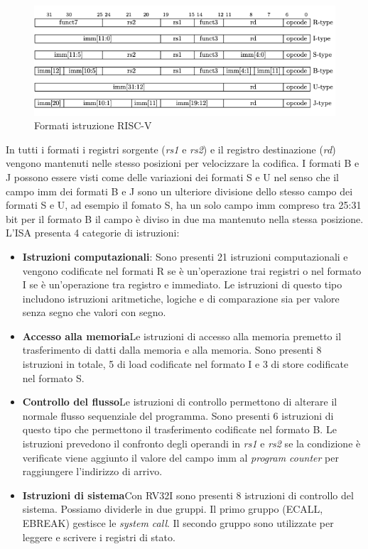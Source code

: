 \documentclass[12pt,a4paper]{report}
\begin{document}
\begin{figure}[h!]
	\includegraphics[width = \textwidth]{FormatiIstruzione.png}
	\caption{Formati istruzione RISC-V}
	\label{Fig:Formati_istruzioni_RV32I}
\end{figure}


In tutti i formati i registri sorgente (\textit{rs1} e \textit{rs2}) e il registro destinazione (\textit{rd}) vengono mantenuti nelle stesso posizioni per velocizzare la codifica.
I formati B e J possono essere visti come delle variazioni dei formati S e U nel senso che il campo imm dei formati B e J sono un ulteriore divisione dello stesso campo dei formati S e U,  ad esempio il fomato S, ha un solo campo imm compreso tra 25:31 bit per il formato B il campo è diviso in due ma mantenuto nella stessa posizione.  L'ISA presenta 4 categorie di istruzioni:
\begin{itemize}
	\item \textbf{Istruzioni computazionali}: Sono presenti 21 istruzioni computazionali e vengono codificate nel formati R se è un'operazione trai registri o nel formato I se è un'operazione tra registro e immediato. Le istruzioni di questo tipo includono istruzioni aritmetiche, logiche e di comparazione sia per valore senza segno che valori con segno.
	\item \textbf{Accesso alla memoria}Le istruzioni di accesso alla memoria premetto il trasferimento di datti dalla memoria e alla memoria. Sono presenti 8 istruzioni in totale, 5 di load codificate nel formato I e 3 di store codificate nel formato S.
	\item \textbf{Controllo del flusso}Le istruzioni di controllo permettono di alterare il normale flusso sequenziale del programma. Sono presenti 6 istruzioni di questo tipo che permettono il trasferimento codificate nel formato B. Le istruzioni prevedono il confronto degli operandi in \textit{rs1} e \textit{rs2} se la condizione  è verificate viene aggiunto il valore del campo imm al \textit{program counter} per raggiungere l'indirizzo di arrivo.
	\item \textbf{Istruzioni di sistema}Con RV32I sono presenti 8 istruzioni di controllo del sistema. Possiamo dividerle in due gruppi. Il primo gruppo (ECALL, EBREAK) gestisce  le \textit{system call}. Il secondo gruppo sono utilizzate per leggere e scrivere i registri di stato.
\end{itemize}
\end{document}
